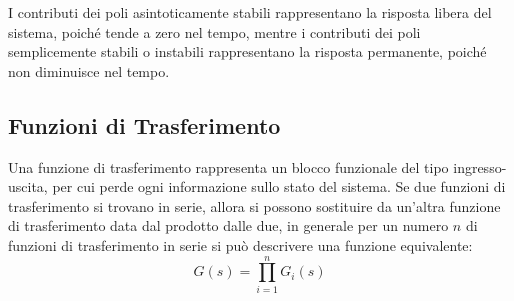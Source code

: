 \documentclass{article}
\numberwithin{equation}{subsection}
\begin{document}
I contributi dei poli asintoticamente stabili rappresentano la risposta libera del sistema, poiché tende a zero nel tempo, mentre i contributi dei poli semplicemente stabili 
o instabili rappresentano la risposta permanente, poiché non diminuisce nel tempo.

\subsection{Funzioni di Trasferimento}
Una funzione di trasferimento rappresenta un blocco funzionale del tipo ingresso-uscita, per cui perde ogni informazione sullo stato del sistema.
Se due funzioni di trasferimento si trovano in serie, allora si possono sostituire da un'altra funzione di trasferimento data dal prodotto dalle due, 
in generale per un numero $n$ di funzioni di trasferimento in serie si può descrivere una funzione equivalente:
\begin{equation}
    G(s)=\displaystyle\prod_{i=1}^nG_i(s)
\end{equation}
\begin{figure}[H]%
    \centering
    \qquad
\end{figure}
\end{document}
